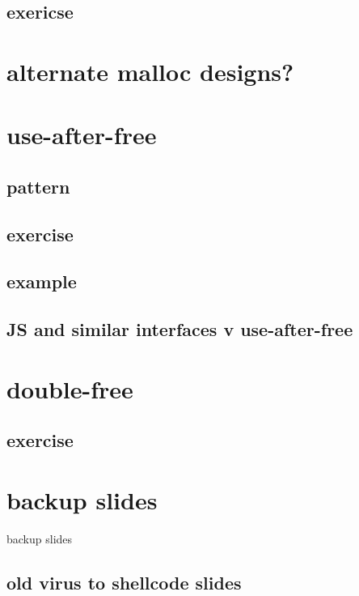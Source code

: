 \subsection{exericse}


\section{alternate malloc designs?}


\section{use-after-free}


\subsection{pattern}


\subsection{exercise}


\subsection{example}


\subsection{JS and similar interfaces v use-after-free}


\section{double-free}


\subsection{exercise}


\section{backup slides}
\begin{frame}{backup slides}
\end{frame}

\subsection{old virus to shellcode slides}



